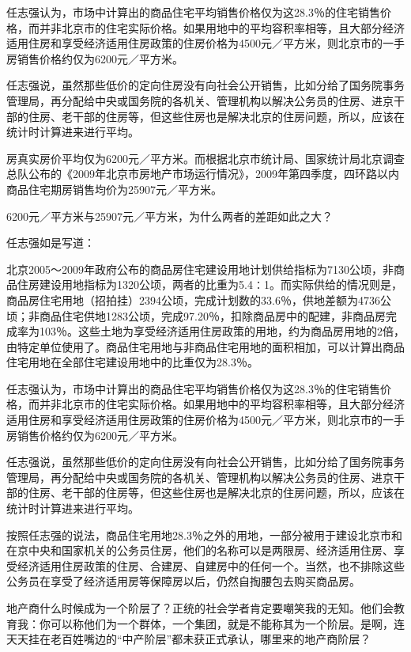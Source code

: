 任志强认为，市场中计算出的商品住宅平均销售价格仅为这28.3％的住宅销售价格，而并非北京市的住宅实际价格。如果用地中的平均容积率相等，且大部分经济适用住房和享受经济适用住房政策的住房价格为4500元／平方米，则北京市的一手房销售价格约仅为6200元／平方米。

任志强说，虽然那些低价的定向住房没有向社会公开销售，比如分给了国务院事务管理局，再分配给中央或国务院的各机关、管理机构以解决公务员的住房、进京干部的住房、老干部的住房等，但这些住房也是解决北京的住房问题，所以，应该在统计时计算进来进行平均。

房真实房价平均仅为6200元／平方米。而根据北京市统计局、国家统计局北京调查总队公布的《2009年北京市房地产市场运行情况》，2009年第四季度，四环路以内商品住宅期房销售均价为25907元／平方米。

6200元／平方米与25907元／平方米，为什么两者的差距如此之大？



任志强如是写道：



北京2005～2009年政府公布的商品房住宅建设用地计划供给指标为7130公顷，非商品住房建设用地指标为1320公顷，两者的比重为5.4∶1。而实际供给的情况则是，商品房住宅用地（招拍挂）2394公顷，完成计划数的33.6％，供地差额为4736公顷；非商品住宅供地1283公顷，完成97.20％，扣除商品房中的配建，非商品房完成率为103％。这些土地为享受经济适用住房政策的用地，约为商品房用地的2倍，由特定单位使用了。商品住宅用地与非商品住宅用地的面积相加，可以计算出商品住宅用地在全部住宅建设用地中的比重仅为28.3％。



任志强认为，市场中计算出的商品住宅平均销售价格仅为这28.3％的住宅销售价格，而并非北京市的住宅实际价格。如果用地中的平均容积率相等，且大部分经济适用住房和享受经济适用住房政策的住房价格为4500元／平方米，则北京市的一手房销售价格约仅为6200元／平方米。

任志强说，虽然那些低价的定向住房没有向社会公开销售，比如分给了国务院事务管理局，再分配给中央或国务院的各机关、管理机构以解决公务员的住房、进京干部的住房、老干部的住房等，但这些住房也是解决北京的住房问题，所以，应该在统计时计算进来进行平均。

按照任志强的说法，商品住宅用地28.3％之外的用地，一部分被用于建设北京市和在京中央和国家机关的公务员住房，他们的名称可以是两限房、经济适用住房、享受经济适用住房政策的住房、合建房、自建房中的任何一个。当然，也不排除这些公务员在享受了经济适用房等保障房以后，仍然自掏腰包去购买商品房。



地产商什么时候成为一个阶层了？正统的社会学者肯定要嘲笑我的无知。他们会教育我：你可以称他们为一个群体，一个集团，就是不能称其为一个阶层。是啊，连天天挂在老百姓嘴边的“中产阶层”都未获正式承认，哪里来的地产商阶层？

